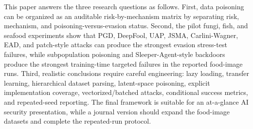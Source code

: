 \documentclass[conference]{IEEEtran}
\begin{document}
This paper answers the three research questions as follows. First, data poisoning can be organized as an auditable risk-by-mechanism matrix by separating risk, mechanism, and poisoning-versus-evasion status. Second, the pilot fungi, fish, and seafood experiments show that PGD, DeepFool, UAP, JSMA, Carlini-Wagner, EAD, and patch-style attacks can produce the strongest evasion stress-test failures, while subpopulation poisoning and Sleeper-Agent-style backdoors produce the strongest training-time targeted failures in the reported food-image runs. Third, realistic conclusions require careful engineering: lazy loading, transfer learning, hierarchical dataset parsing, latent-space poisoning, explicit implementation coverage, vectorized/batched attacks, conditional success metrics, and repeated-seed reporting. The final framework is suitable for an at-a-glance AI security presentation, while a journal version should expand the food-image datasets and complete the repeated-run protocol.
\end{document}
